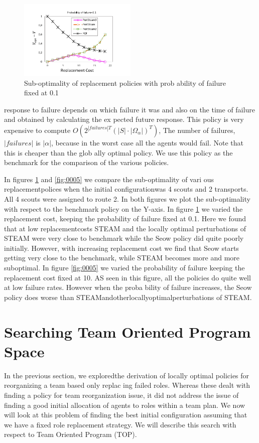 \documentclass{IEEEtran}
\begin{document}
\begin{figure}[htb]
        \centering
        \includegraphics[width=0.5\textwidth]{figure0004.pdf}
        \caption{Sub-optimality of replacement policies with prob
        ability of failure fixed at 0.1}
        \label{fig:0004}
        \end{figure}
        
response to failure depends on which failure it was and also
 on the time of failure and obtained by calculating the ex
pected future response. This policy is very expensive to
 compute $O(2^{|failures|T}(|S|\cdot|\Omega_\alpha|)^T)$, The number of failures, $|failures|$ is $|\alpha|$,  because in the worst case all the
 agents would fail. Note that this is cheaper than the glob
ally optimal policy. We use this policy as the benchmark for
 the comparison of the various policies.

  In figures \ref{fig:0004} and \ref{fig:0005} we compare the sub-optimality of vari
ous replacementpolices when the initial configurationwas 4
 scouts and 2 transports. All 4 scouts were assigned to route
 2. In both figures we plot the sub-optimality with respect to
 the benchmark policy on the Y-axis. In figure \ref{fig:0004} we varied
 the replacement cost, keeping the probability of failure fixed
 at 0.1. Here we found that at low replacementcosts STEAM
 and the locally optimal perturbations of STEAM were very
 close to benchmark while the Seow policy did quite poorly
 initially. However, with increasing replacement cost we find
 that Seow starts getting very close to the benchmark, while
 STEAM becomes more and more suboptimal. In figure \ref{fig:0005}
 we varied the probability of failure keeping the replacement
 cost fixed at 10. AS seen in this figure, all the policies do
 quite well at low failure rates. However when the proba
bility of failure increases, the Seow policy does worse than
 STEAMandotherlocallyoptimalperturbations of STEAM.

\section{\textbf{Searching Team Oriented Program Space}}
In the previous section, we exploredthe derivation of locally
 optimal policies for reorganizing a team based only replac
ing failed roles. Whereas these dealt with finding a policy
 for team reorganization issue, it did not address the issue
 of finding a good initial allocation of agents to roles within
 a team plan. We now will look at this problem of finding
 the best initial configuration assuming that we have a fixed
 role replacement strategy. We will describe this search with
 respect to Team Oriented Program (TOP).
\end{document}

